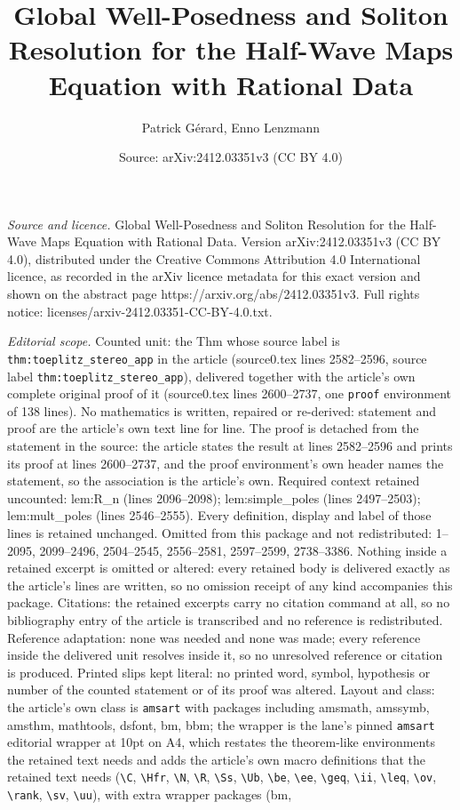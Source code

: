 \documentclass[10pt,a4paper]{amsart}
\title[Global Well-Posedness and Soliton Resolution for the Half-Wa]{Global Well-Posedness and Soliton Resolution for the Half-Wave Maps Equation with Rational Data}
\author{Patrick G\'erard, Enno Lenzmann}
\date{Source: arXiv:2412.03351v3 (CC BY 4.0)}
\begin{document}
\maketitle

\noindent\emph{Source and licence.} Global Well-Posedness and Soliton Resolution for the Half-Wave Maps Equation with Rational Data. Version arXiv:2412.03351v3 (CC BY 4.0), distributed under the Creative Commons Attribution 4.0 International licence, as recorded in the arXiv licence metadata for this exact version and shown on the abstract page https://arxiv.org/abs/2412.03351v3. Full rights notice: licenses/arxiv-2412.03351-CC-BY-4.0.txt.\par\smallskip

\noindent\textit{Editorial scope.} Counted unit: the Thm whose source label is \texttt{thm:toeplitz\_stereo\_app} in the article (source0.tex lines 2582--2596, source label \texttt{thm:toeplitz\_stereo\_app}), delivered together with the article's own complete original proof of it (source0.tex lines 2600--2737, one \texttt{proof} environment of 138 lines). No mathematics is written, repaired or re-derived: statement and proof are the article's own text line for line. The proof is detached from the statement in the source: the article states the result at lines 2582--2596 and prints its proof at lines 2600--2737, and the proof environment's own header names the statement, so the association is the article's own. Required context retained uncounted: lem:R\_n (lines 2096--2098); lem:simple\_poles (lines 2497--2503); lem:mult\_poles (lines 2546--2555). Every definition, display and label of those lines is retained unchanged. Omitted from this package and not redistributed: 1--2095, 2099--2496, 2504--2545, 2556--2581, 2597--2599, 2738--3386. Nothing inside a retained excerpt is omitted or altered: every retained body is delivered exactly as the article's lines are written, so no omission receipt of any kind accompanies this package. Citations: the retained excerpts carry no citation command at all, so no bibliography entry of the article is transcribed and no reference is redistributed. Reference adaptation: none was needed and none was made; every reference inside the delivered unit resolves inside it, so no unresolved reference or citation is produced. Printed slips kept literal: no printed word, symbol, hypothesis or number of the counted statement or of its proof was altered. Layout and class: the article's own class is \texttt{amsart} with packages including amsmath, amssymb, amsthm, mathtools, dsfont, bm, bbm; the wrapper is the lane's pinned \texttt{amsart} editorial wrapper at 10pt on A4, which restates the theorem-like environments the retained text needs and adds the article's own macro definitions that the retained text needs (\texttt{\textbackslash C}, \texttt{\textbackslash Hfr}, \texttt{\textbackslash N}, \texttt{\textbackslash R}, \texttt{\textbackslash Ss}, \texttt{\textbackslash Ub}, \texttt{\textbackslash be}, \texttt{\textbackslash ee}, \texttt{\textbackslash geq}, \texttt{\textbackslash ii}, \texttt{\textbackslash leq}, \texttt{\textbackslash ov}, \texttt{\textbackslash rank}, \texttt{\textbackslash sv}, \texttt{\textbackslash uu}), with extra wrapper packages (bm, 
\end{document}
